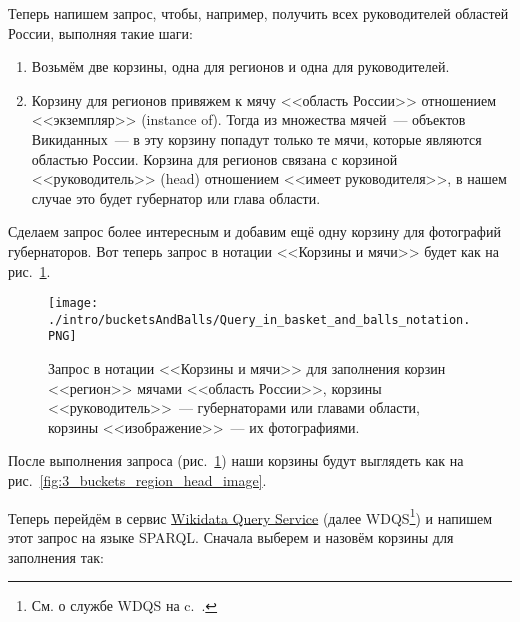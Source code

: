 Теперь напишем запрос, чтобы, например, получить всех руководителей областей России, выполняя такие шаги:

\begin{enumerate}
    \item Возьмём две корзины, одна для регионов и одна для руководителей.
    \item Корзину для регионов привяжем к мячу <<область России>> отношением <<экземпляр>> (instance of). Тогда из множества мячей~--- объектов Викиданных~--- в эту корзину попадут только те мячи, которые являются областью России. Корзина для регионов связана с корзиной <<руководитель>> (head) отношением <<имеет руководителя>>, в нашем случае это будет губернатор или глава области.
\end{enumerate}


\newpage
Сделаем запрос более интересным и добавим ещё одну корзину для фотографий губернаторов. Вот теперь запрос в нотации <<Корзины и мячи>> будет как на рис.~\ref{fig:Query_in_basket_and_balls_notation}.

\begin{figure}[h]
    \texttt{[image: ./intro/bucketsAndBalls/Query\_in\_basket\_and\_balls\_notation.PNG]}
    \caption[Запрос в нотации <<Корзины и мячи>> для заполнения корзин мячами.]{Запрос в нотации <<Корзины и мячи>> для заполнения корзин <<регион>> мячами <<область России>>, корзины <<руководитель>>~--- губернаторами или главами области, корзины <<изображение>>~--- их фотографиями.}
	\label{fig:Query_in_basket_and_balls_notation}
\end{figure}

После выполнения запроса (рис.~\ref{fig:Query_in_basket_and_balls_notation}) наши корзины будут выглядеть как на рис.~\ref{fig:3_buckets_region_head_image}.

\begin{marginfigure}
	{
		\setlength{\fboxsep}{0pt}%
		\setlength{\fboxrule}{1pt}%
	}
    \caption[Заполненные корзины после выполнении запроса.]{Корзины после выполнении запроса на рис.~\ref{fig:Query_in_basket_and_balls_notation}.\\ \textit{?region}~--- это области России, \textit{?head}~--- это руководители, \textit{?image}~--- это фотографии руководства.}
	\label{fig:3_buckets_region_head_image}
\end{marginfigure}

Теперь перейдём в сервис \href{https://query.wikidata.org/}{Wikidata Query Service} 
(далее WDQS\footnote[][15pt]{См. о службе WDQS на c.~\pageref{sect:WDQS}.})  и напишем этот запрос на языке SPARQL. Сначала выберем и назовём корзины для заполнения так:

